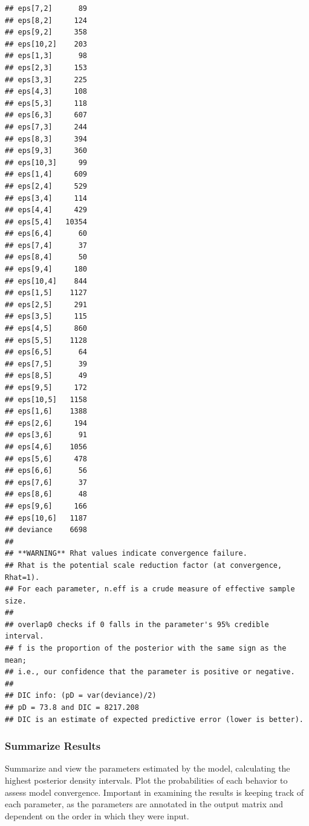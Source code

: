 \documentclass[]{article}
\newenvironment{Shaded}{\begin{snugshade}}{\end{snugshade}}
\newcommand{\CommentTok}[1]{\textcolor[rgb]{0.56,0.35,0.01}{\textit{#1}}}
\newcommand{\NormalTok}[1]{#1}
\newcommand{\OperatorTok}[1]{\textcolor[rgb]{0.81,0.36,0.00}{\textbf{#1}}}
\begin{document}
\begin{verbatim}
## eps[7,2]      89
## eps[8,2]     124
## eps[9,2]     358
## eps[10,2]    203
## eps[1,3]      98
## eps[2,3]     153
## eps[3,3]     225
## eps[4,3]     108
## eps[5,3]     118
## eps[6,3]     607
## eps[7,3]     244
## eps[8,3]     394
## eps[9,3]     360
## eps[10,3]     99
## eps[1,4]     609
## eps[2,4]     529
## eps[3,4]     114
## eps[4,4]     429
## eps[5,4]   10354
## eps[6,4]      60
## eps[7,4]      37
## eps[8,4]      50
## eps[9,4]     180
## eps[10,4]    844
## eps[1,5]    1127
## eps[2,5]     291
## eps[3,5]     115
## eps[4,5]     860
## eps[5,5]    1128
## eps[6,5]      64
## eps[7,5]      39
## eps[8,5]      49
## eps[9,5]     172
## eps[10,5]   1158
## eps[1,6]    1388
## eps[2,6]     194
## eps[3,6]      91
## eps[4,6]    1056
## eps[5,6]     478
## eps[6,6]      56
## eps[7,6]      37
## eps[8,6]      48
## eps[9,6]     166
## eps[10,6]   1187
## deviance    6698
## 
## **WARNING** Rhat values indicate convergence failure. 
## Rhat is the potential scale reduction factor (at convergence, Rhat=1). 
## For each parameter, n.eff is a crude measure of effective sample size. 
## 
## overlap0 checks if 0 falls in the parameter's 95% credible interval.
## f is the proportion of the posterior with the same sign as the mean;
## i.e., our confidence that the parameter is positive or negative.
## 
## DIC info: (pD = var(deviance)/2) 
## pD = 73.8 and DIC = 8217.208 
## DIC is an estimate of expected predictive error (lower is better).
\end{verbatim}

\hypertarget{summarize-results}{%
\subsubsection{Summarize Results}\label{summarize-results}}

Summarize and view the parameters estimated by the model, calculating
the highest posterior density intervals. Plot the probabilities of each
behavior to assess model convergence. Important in examining the results
is keeping track of each parameter, as the parameters are annotated in
the output matrix and dependent on the order in which they were input.

\begin{Shaded}
\end{Shaded}
\end{document}
